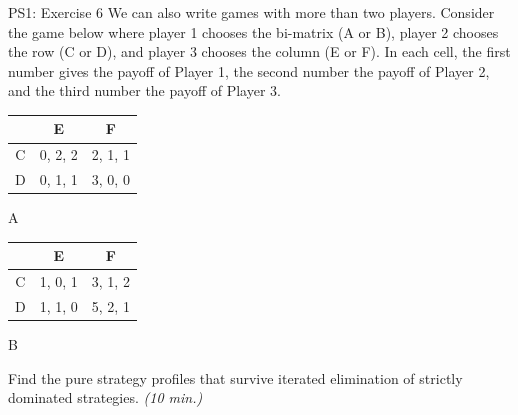 \begin{frame}{PS1: Exercise 6}
  We can also write games with more than two players. Consider the game below where
  player 1 chooses the bi-matrix (A or B), player 2 chooses the row (C or D), and player 3
  chooses the column (E or F). In each cell, the first number gives the payoff of Player 1,
  the second number the payoff of Player 2, and the third number the payoff of Player 3.
\begin{multicols}{2}
\begin{table}
  \begin{tabular}{c|c|c}
      & E       & F       \\
    \midrule
    C & 0, 2, 2 & 2, 1, 1 \\
    \midrule
    D & 0, 1, 1 & 3, 0, 0
  \end{tabular}
  \center A
\end{table}
\vfill\null
\columnbreak
\begin{table}
  \begin{tabular}{c|c|c}
      & E       & F       \\
    \midrule
    C & 1, 0, 1 & 3, 1, 2 \\
    \midrule
    D & 1, 1, 0 & 5, 2, 1
  \end{tabular}
  \center B
\end{table}
\vfill\null
\end{multicols}
Find the pure strategy profiles that survive iterated elimination of strictly dominated strategies. \textit{(10 min.)}
\end{frame}

